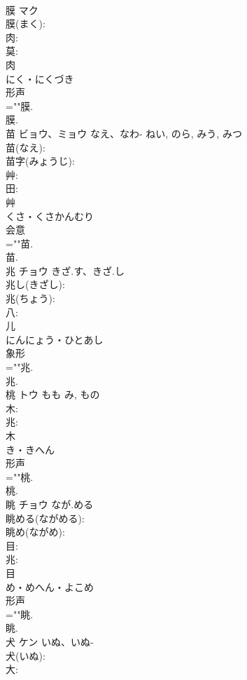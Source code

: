 \documentclass[8pt]{extreport}
\begin{document}
\begin{CJK}{UTF8}{min}
\\	膜	マク			
\\	膜(まく): 
\\	肉: 
\\	莫: 
\\	肉	
\\	にく・にくづき	
\\	形声 
\\	=""膜.
\\	膜.
\\	苗	ビョウ、ミョウ	なえ、なわ-	ねい, のら, みう, みつ	
\\	苗(なえ): 
\\	苗字(みょうじ): 
\\	艸: 
\\	田: 
\\	艸	
\\	くさ・くさかんむり	
\\	会意 
\\	=""苗.
\\	苗.
\\	兆	チョウ	きざ.す、きざ.し		
\\	兆し(きざし): 
\\	兆(ちょう): 
\\	八: 
\\	儿	
\\	にんにょう・ひとあし	
\\	象形 
\\	=""兆.
\\	兆.
\\	桃	トウ	もも	み, もの	
\\	木: 
\\	兆: 
\\	木	
\\	き・きへん	
\\	形声 
\\	=""桃.
\\	桃.
\\	眺	チョウ	なが.める		
\\	眺める(ながめる): 
\\	眺め(ながめ): 
\\	目: 
\\	兆: 
\\	目	
\\	め・めへん・よこめ	
\\	形声 
\\	=""眺.
\\	眺.
\\	犬	ケン	いぬ、いぬ-		
\\	犬(いぬ): 
\\	大: 

\end{CJK}
\end{document}
